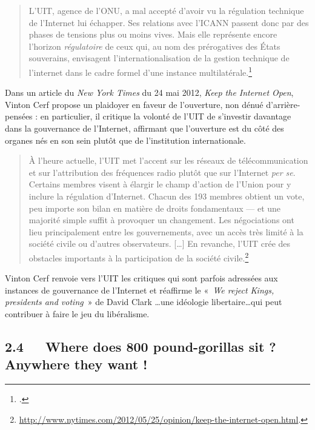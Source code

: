 \documentclass{FramateX}
\begin{document}
\begin{refsection}
\begin{quote}
L'UIT, agence de l'ONU, a mal
accepté d'avoir vu la régulation technique de
l'Internet lui échapper. Ses relations avec
l'ICANN passent donc par des phases de tensions plus
ou moins vives. Mais elle représente encore l'horizon
\textit{régulatoire} de ceux qui, au nom des prérogatives des États
souverains, envisagent l'internationalisation de la
gestion technique de l'internet dans le cadre formel
d'une instance multilatérale.\footnote{\cite[p.~36]{massit-folleagouvernance2012}.}
\end{quote}

Dans un article du \textit{New York Times} du 24 mai 2012, \textit{Keep the Internet Open}, Vinton Cerf propose un plaidoyer en faveur de
l'ouverture, non dénué
d'arrière-pensées : en particulier, il critique la
volonté de l'UIT de s'investir
davantage dans la gouvernance de l'Internet, affirmant
que l'ouverture est du côté des organes nés en son
sein plutôt que de l'institution internationale. 

\begin{quote}
À l'heure actuelle, l'UIT met
l'accent sur les réseaux de télécommunication et sur
l'attribution des fréquences radio plutôt que sur
l'Internet \textit{per se}. Certains membres visent à
élargir le champ d'action de l'Union
pour y inclure la régulation d'Internet. Chacun des
193 membres obtient un vote, peu importe son bilan en matière de droits
fondamentaux — et une majorité simple suffit à provoquer un changement.
Les négociations ont lieu principalement entre les gouvernements, avec
un accès très limité à la société civile ou d'autres
observateurs. [\ldots] En revanche, l'UIT crée des
obstacles importants à la participation de la société
civile.\footnote{\url{http://www.nytimes.com/2012/05/25/opinion/keep-the-internet-open.html}.}
\end{quote}

Vinton Cerf renvoie vers l'UIT les critiques qui sont
parfois adressées aux instances de gouvernance de
l'Internet et réaffirme le «\textit{~We reject Kings,
presidents and voting~}» de David Clark \ldots une idéologie libertaire\ldots qui  peut contribuer à faire le jeu du libéralisme.

\subsection*{2.4~~~Where does 800 pound-gorillas sit ? Anywhere they want !}
{}


\end{refsection}
\end{document}
